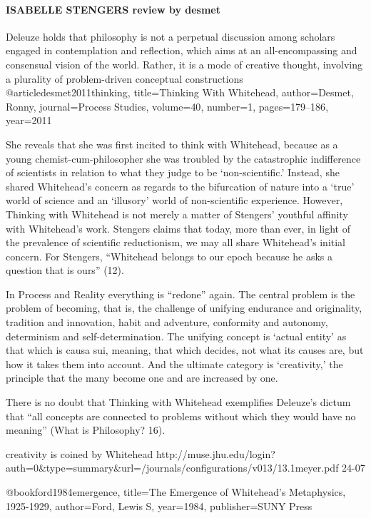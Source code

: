 \paragraph{ISABELLE STENGERS review by desmet}
Deleuze holds that
philosophy is not a perpetual discussion among scholars engaged in contemplation
and reflection, which aims at an all-encompassing and consensual vision of the world.
Rather, it is a mode of creative thought, involving a plurality of problem-driven
conceptual constructions
\cite{keylist}
@article{desmet2011thinking,
	title={Thinking With Whitehead},
	author={Desmet, Ronny},
	journal={Process Studies},
	volume={40},
	number={1},
	pages={179--186},
	year={2011}
	}

She reveals that she was first incited to think with Whitehead,
because as a young chemist-cum-philosopher she was troubled by the catastrophic
indifference of scientists in relation to what they judge to be ‘non-scientific.’ Instead,
she shared Whitehead’s concern as regards to the bifurcation of nature into a ‘true’
world of science and an ‘illusory’ world of non-scientific experience. However,
Thinking with Whitehead is not merely a matter of Stengers’ youthful affinity with
Whitehead’s work. Stengers claims that today, more than ever, in light of the
prevalence of scientific reductionism, we may all share Whitehead’s initial concern.
For Stengers, “Whitehead belongs to our epoch because he asks a question that is
ours” (12).

In Process and Reality everything is
“redone” again. The central problem is the problem of becoming, that is, the
challenge of unifying endurance and originality, tradition and innovation, habit and
adventure, conformity and autonomy, determinism and self-determination. The
unifying concept is ‘actual entity’ as that which is causa sui, meaning, that which
decides, not what its causes are, but how it takes them into account. And the ultimate
category is ‘creativity,’ the principle that the many become one and are increased by
one.
	
	
There is no doubt that Thinking with Whitehead exemplifies Deleuze’s dictum that
“all concepts are connected to problems without which they would have no meaning”
(What is Philosophy? 16).


creativity is coined by Whitehead 
\cite{steven meyer}
http://muse.jhu.edu/login?auth=0&type=summary&url=/journals/configurations/v013/13.1meyer.pdf
24-07

\cite{Ford}
@book{ford1984emergence,
	title={The Emergence of Whitehead's Metaphysics, 1925-1929},
	author={Ford, Lewis S},
	year={1984},
	publisher={SUNY Press}
}

